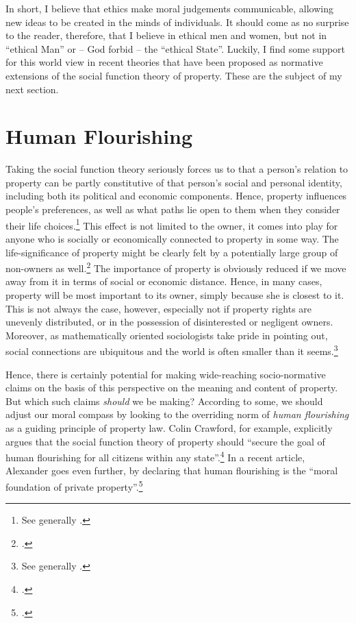 In short, I believe that ethics make moral judgements communicable, allowing new ideas to be created in the minds of individuals. It should come as no surprise to the reader, therefore, that I believe in ethical men and women, but not in ``ethical Man'' or -- God forbid --  the ``ethical State''. Luckily, I find some support for this world view in recent theories that have been proposed as normative extensions of the social function theory of property. These are the subject of my next section.

\section{Human Flourishing}\label{sec:hf}

Taking the social function theory seriously forces us to  that a person's relation to property can be partly constitutive of that person's social and personal identity, including both its political and economic components. Hence, property influences people's preferences, as well as what paths lie open to them when they consider their life choices.\footnote{See generally \cite{alexander09}.} This effect is not limited to the owner, it comes into play for anyone who is socially or economically connected to property in some way. The life-significance of property might be clearly felt by a potentially large group of non-owners as well.\footcite[128-129]{alexander09d} The importance of property is obviously reduced if we move away from it in terms of social or economic distance. Hence, in many cases, property will be most important to its owner, simply because she is closest to it. This is not always the case, however, especially not if property rights are unevenly distributed, or in the possession of disinterested or negligent owners. Moreover, as mathematically oriented sociologists take pride in pointing out, social connections are ubiquitous  and the world is often smaller than it seems.\footnote{See generally \cite{schnettler09}.}

Hence, there is certainly potential for making wide-reaching socio-normative claims on the basis of this perspective on the meaning and content of property. But which such claims {\it should} we be making? According to some, we should adjust our moral compass by looking to the overriding norm of {\it human flourishing} as a guiding principle of property law. Colin Crawford, for example, explicitly argues that the social function theory of property should ``secure the goal of human flourishing for all citizens within any state''.\footcite[1089]{crawford11} In a recent article, Alexander goes even further, by declaring that human flourishing is the ``moral foundation of private property''.\footcite[1261]{alexander14} 

